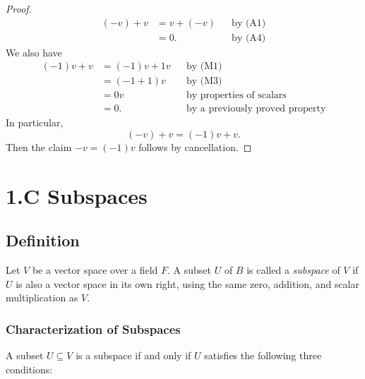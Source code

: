 \documentclass[11pt]{article}
\begin{document}
\begin{itemize}
\begin{proof}
\begin{align*}
                (-v) + v &= v + (-v) && \text{by (A1)} \\
                         &= 0.       && \text{by (A4)}
            \end{align*}
            We also have
            \begin{align*}
                (-1)v + v &= (-1)v + 1v && \text{by (M1)} \\
                          &= (-1 + 1)v  && \text{by (M3)} \\
                          &= 0v         && \text{by properties of scalars} \\
                          &= 0.         && \text{by a previously proved property}
            \end{align*}
            In particular, \[(-v) + v = (-1)v + v.\] Then the claim \(-v = (-1)v\) follows by cancellation.
        \end{proof}
    \end{itemize}

    \pagebreak

    \section{1.C Subspaces}

    \subsection{Definition}

    Let $V$ be a vector space over a field $F$. A subset $U$ of $B$ is called a \emph{subspace} of $V$ if $U$ is also a vector space in its own right, using the same zero, addition, and scalar multiplication as $V$.

    \subsubsection{Characterization of Subspaces}

    A subset $U \subseteq V$ is a subspace if and only if $U$ satisfies the following three conditions:
\end{document}
